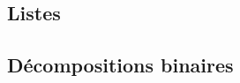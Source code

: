 

\usepackage{parcolumns}
\setlength{\parindent}{0pt}

 

\subsection{Listes}


\subsection{Décompositions binaires}


